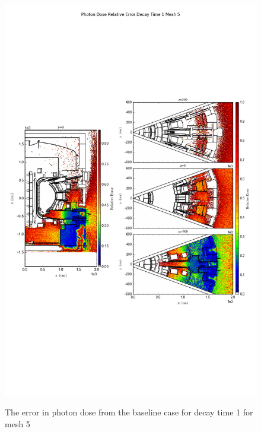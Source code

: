 \begin{figure}[ht!]
\centering
\includegraphics[trim={0cm 9cm 0cm 10cm},clip,scale=0.75]{../plots/final_model/Photon_Dose_Relative_Error_Decay_Time_1_Mesh_5.png}
\label{fig:photons_dc1_no4bc_m5_error}
\caption{The error in photon dose from the baseline case for decay time 1 for mesh 5}
\end{figure}
